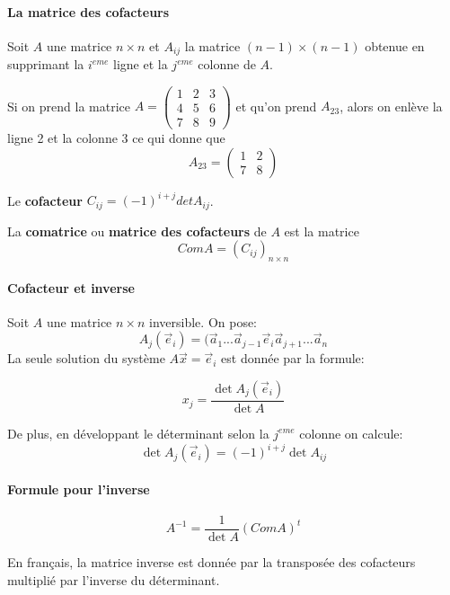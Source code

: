 \documentclass[11pt]{book}
\begin{document}
\paragraph{La matrice des cofacteurs} Soit $A$ une matrice $n \times n$ et $A_{ij}$ la matrice $(n-1) \times (n-1)$ obtenue en supprimant la $i^{eme}$ ligne et la $j^{eme}$ colonne de $A$.
\\
\begin{exemple}
    Si on prend la matrice $A = \begin{pmatrix}
        1 & 2 & 3 \\
        4 & 5 & 6 \\
        7 & 8 & 9
    \end{pmatrix}$ et qu'on prend $A_{23}$, alors on enlève la ligne 2 et la colonne 3 ce qui donne que 
    \[ A_{23} = \begin{pmatrix}
        1 & 2 \\
        7 & 8
    \end{pmatrix}\]
    \begin{defn}
        Le \textbf{cofacteur} $C_{ij} = (-1)^{i+j}det A_{ij}$.
    \end{defn}
\end{exemple}
\begin{defn}
    La \textbf{comatrice} ou \textbf{matrice des cofacteurs} de $A$ est la matrice
    \[ComA = (C_{ij})_{n\times n}\]
\end{defn}


\paragraph{Cofacteur et inverse}
Soit $A$ une matrice $n \times n$ inversible. On pose:
\[A_j(\vec{e}_i) = (\vec{a}_1 ... \vec{a}_{j-1} \vec{e}_i \vec{a}_{j+1} ... \vec{a}_n\]
La seule solution du système $A\vec{x} = \vec{e}_i$ est donnée par la formule:
\begin{definition}
    \begin{equation*}
        x_j = \frac{\det A_j(\vec{e}_i)}{\det A}
    \end{equation*}
\end{definition}


De plus, en développant le déterminant selon la $j^{eme}$ colonne on calcule:
\[\det A_j(\vec{e}_i) = (-1)^{i+j}\det A_{ij}\]

\paragraph{Formule pour l'inverse}
\begin{definition}
    \begin{equation*}
        A^{-1} = \frac{1}{\det A}(ComA)^t
    \end{equation*}
\end{definition}
En français, la matrice inverse est donnée par la transposée des cofacteurs multiplié par l'inverse du déterminant.
\end{document}
